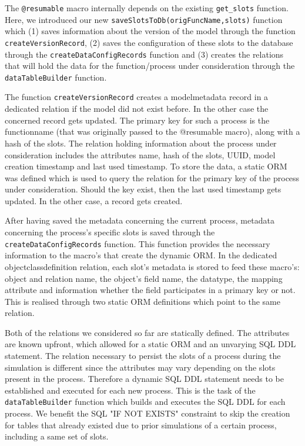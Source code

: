\documentclass{juliacon}
\begin{document}
The \texttt{@resumable} macro internally depends on the existing \texttt{get\_slots} function. Here, we introduced our new \texttt{saveSlotsToDb(origFuncName,slots)} function which (1) saves information about the version of the model through the function \texttt{createVersionRecord}, (2) saves the configuration of these slots to the database through the \texttt{createDataConfigRecords} function and (3) creates the relations that will hold the data for the function/process under consideration through the \texttt{dataTableBuilder} function. \vskip 6pt

The function \texttt{createVersionRecord} creates a modelmetadata record in a dedicated relation if the model did not exist before. In the other case the concerned record gets updated. The primary key for such a process is the functionname (that was originally passed to the @resumable macro), along with a hash of the slots. The relation holding information about the process under consideration includes the attributes name, hash of the slots, UUID, model creation timestamp and last used timestamp. To store the data, a static ORM was defined which is used to query the relation for the primary key of the process under consideration. Should the key exist, then the last used timestamp gets updated. In the other case, a record gets created. \vskip 6pt

After having saved the metadata concerning the current process, metadata concerning the process's specific slots is saved through the \texttt{createDataConfigRecords} function. This function provides the necessary information to the macro's that create the dynamic ORM. In the dedicated objectclassdefinition relation, each slot's metadata is stored to feed these macro's: object and relation name, the object's field name, the datatype, the mapping attribute and information whether the field participates in a primary key or not. This is realised through two static ORM definitions which point to the same relation. \vskip 6pt

Both of the relations we considered so far are statically defined. The attributes are known upfront, which allowed for a static ORM and an unvarying SQL DDL statement. The relation necessary to persist the slots of a process during the simulation is different since the attributes may vary depending on the slots present in the process. Therefore a dynamic SQL DDL statement needs to be established and executed for each new process. This is the task of the \texttt{dataTableBuilder} function which builds and executes the SQL DDL for each process. We benefit the SQL "IF NOT EXISTS" constraint to skip the creation for tables that already existed due to prior simulations of a certain process, including a same set of slots. \vskip 6pt
\end{document}
